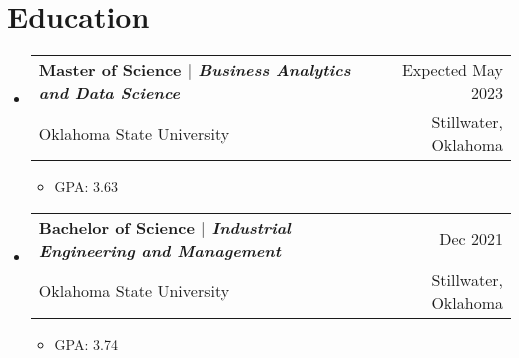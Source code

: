 \documentclass[letterpaper,12pt]{article} %
\makeatletter
\newcommand{\CVItem}[1]{
  \item\small{
    {#1 \vspace{-2pt}}
  }
}
\newcommand{\CVSubheading}[4]{
  \vspace{-2pt}\item
    \begin{tabular*}{0.97\textwidth}[t]{l@{\extracolsep{\fill}}r}
      \textbf{#1} & #2 \\
      \small#3 & \small #4 \\
    \end{tabular*}\vspace{-7pt}
}
\newcommand{\CVSubHeadingListStart}{\begin{itemize}[leftmargin=0.5cm, label={}]}
\newcommand{\CVSubHeadingListEnd}{\end{itemize}}
\newcommand{\CVItemListStart}{\begin{itemize}}
\newcommand{\CVItemListEnd}{\end{itemize}\vspace{-5pt}}
\makeatother
\begin{document}
\begin{comment}
This CV was written for specifically for positions I was applying for in
academia, and then modified to be a template.

A standard CV is about two pages long where as a resume in the US is one page.
sections can be added and removed here with this in mind. In my experience, 
education, and applicable work experience and skills are the most import things
to include on a resume. For a CV the Europass CV suggests the categories: Work
Experience, Education and Training, Language Skills, Digital Skills,
Communication and Interpersonal Skills, Conferences and Seminars, Creative Works
Driver's License, Hobbies and Interests, Honors and Awards, Management and
Leadership Skills, Networks and Memberships, Organizational Skills, Projects,
Publications, Recommendations, Social and Political Activities, Volunteering.

Your goal is to convey a who, what , when, where, why for every item you share. 
The who is obviously you, but I believe the rest should be done in that order.
For example below. An employer cares most about the degree held and typically 
less about the institution or where it is located (This is still good 
information though). Whatever order you choose be consistent throughout.
\end{comment}

\section{Education}
  \CVSubHeadingListStart
    
    \CVSubheading
      {{Master of Science $|$ \emph{\small{Business Analytics and Data Science}}}}{Expected May 2023}
      {Oklahoma State University}{Stillwater, Oklahoma}
      \CVItemListStart
        \CVItem{GPA: 3.63}
      \CVItemListEnd
    \CVSubheading
      {{Bachelor of Science $|$ \emph{\small{Industrial Engineering and Management}}}}{Dec 2021}
      {Oklahoma State University}{Stillwater, Oklahoma}
      \CVItemListStart
        \CVItem{GPA: 3.74}
      \CVItemListEnd
  \CVSubHeadingListEnd
\end{document}
